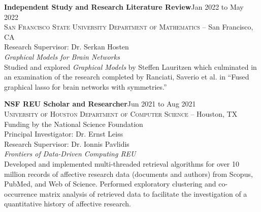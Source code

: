 \documentclass[hidelinks, 10pt]{article}
\def\contentspacing{2.5mm}          %
\begin{document}
{\begin{minipage}[ct]{0.9\linewidth}
    \textbf{Independent Study and Research Literature Review}\hfill Jan 2022 to May 2022\\
    \textsc{San Francisco State University Department of Mathematics} -- San Francisco, CA\\
    Research Supervisor: Dr. Serkan Hosten\vspace{1mm}\\
    {\textit{Graphical Models for Brain Networks}}\\
    Studied and explored \emph{Graphical Models} by Steffen Lauritzen which
    culminated in an examination of the research completed by Ranciati, Saverio et
    al. in ``Fused graphical lasso for brain networks with symmetries.''
\end{minipage}

\vspace{\contentspacing}

\begin{minipage}[ct]{0.9\linewidth}
    \textbf{NSF REU Scholar and Researcher}\hfill Jun 2021 to Aug 2021\\
    \textsc{University of Houston Department of Computer Science} -- Houston, TX\\
    Funding by the National Science Foundation\\
    Principal Investigator: Dr. Ernst Leiss\\
    Research Supervisor: Dr. Ionnis Pavlidis\vspace{1mm}\\
    {\textit{Frontiers of Data-Driven Computing REU}}\\
    Developed and implemented multi-threaded retrieval algorithms for over 10 million
    records of affective research data (documents and authors) from Scopus, PubMed,
    and Web of Science. Performed exploratory clustering and co-occurrence matrix
    analysis of retrieved data to facilitate the investigation of a quantitative history of
    affective research.
\end{minipage}

}
\end{document}
